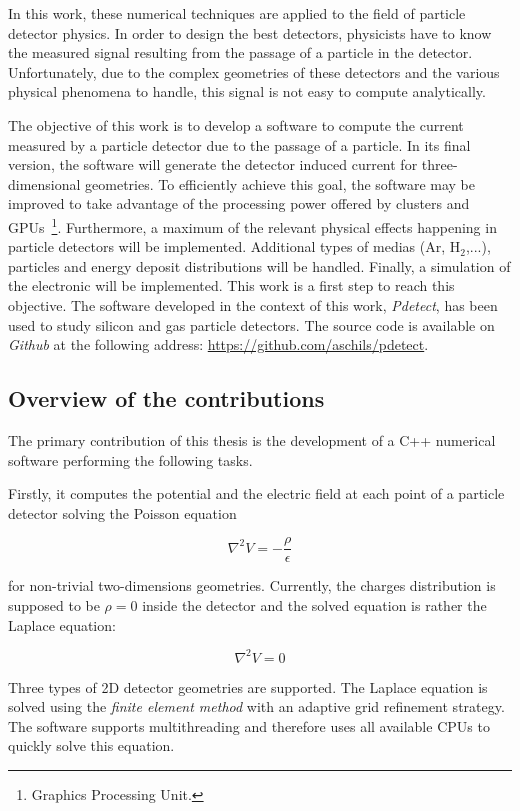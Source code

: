 \documentclass[11pt]{article}
\begin{document}
	In this work, these numerical techniques are applied to the field of particle
	detector physics. In order to design the best detectors,
	physicists have to know the measured signal resulting from the passage of a particle
	in the detector. Unfortunately, due to the complex geometries of these detectors
	and the various physical phenomena to handle, this signal is not easy
	to compute analytically.

	The objective of this work is to develop a software to compute the current measured
	by a particle detector due to the passage of a particle. In its final version,
	the software will generate the detector induced current for three-dimensional
	geometries. To efficiently achieve this goal, the software may be improved
	to take advantage of the processing power offered by clusters and GPUs~\footnote{Graphics Processing Unit.}.
	Furthermore, a maximum of the relevant physical effects happening
	in particle detectors will be implemented.
	Additional types of medias (Ar, H$_2$,...), particles and energy deposit
	distributions will be handled. Finally, a simulation of the electronic will
	be implemented. This work is a first step to reach this objective.
	The software developed in the context of this work, \textit{Pdetect},
	has been used to study silicon and gas particle detectors. The source code
	is available on \textit{Github} at the following address:
	\url{https://github.com/aschils/pdetect}.

	\subsection*{Overview of the contributions}

		The primary contribution of this thesis is the development of a C++ numerical software performing the
		following tasks.

		Firstly, it computes the potential and the electric field
		at each point of a particle detector solving the Poisson equation

		\[\nabla^2 V = -\frac{\rho}{\epsilon}\]

		for non-trivial	two-dimensions geometries. Currently, the charges distribution
		is supposed to be $\rho=0$ inside the detector and the solved equation is
		rather the Laplace equation:

		\[\nabla^2 V = 0\]

		Three types of 2D detector geometries are supported.
		The Laplace equation is solved using the \textit{finite element method} with an adaptive
		grid refinement strategy. The software supports multithreading and therefore
		uses all available CPUs to quickly solve this equation.
\end{document}
